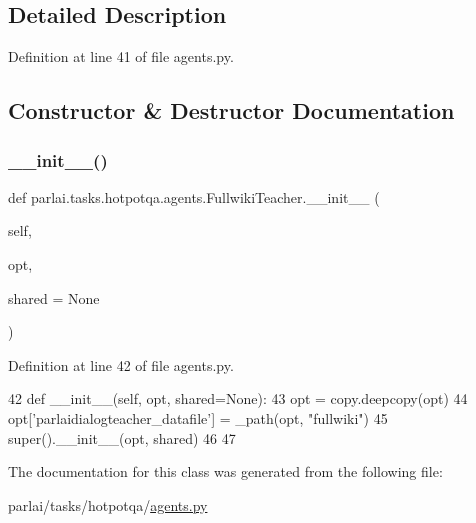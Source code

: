 \subsection{Detailed Description}


Definition at line 41 of file agents.\+py.



\subsection{Constructor \& Destructor Documentation}
\mbox{\label{classparlai_1_1tasks_1_1hotpotqa_1_1agents_1_1FullwikiTeacher_a7e12fc08024330f828800caee978f7d7}} 
\subsubsection{\texorpdfstring{\+\_\+\+\_\+init\+\_\+\+\_\+()}{\_\_init\_\_()}}
{\footnotesize\ttfamily def parlai.\+tasks.\+hotpotqa.\+agents.\+Fullwiki\+Teacher.\+\_\+\+\_\+init\+\_\+\+\_\+ (\begin{DoxyParamCaption}\item[{}]{self,  }\item[{}]{opt,  }\item[{}]{shared = {\ttfamily None} }\end{DoxyParamCaption})}



Definition at line 42 of file agents.\+py.


\begin{DoxyCode}
42     \textcolor{keyword}{def }\_\_init\_\_(self, opt, shared=None):
43         opt = copy.deepcopy(opt)
44         opt[\textcolor{stringliteral}{'parlaidialogteacher\_datafile'}] = \_path(opt, \textcolor{stringliteral}{"fullwiki"})
45         super().\_\_init\_\_(opt, shared)
46 
47 
\end{DoxyCode}


The documentation for this class was generated from the following file\+:\begin{DoxyCompactItemize}
\item 
parlai/tasks/hotpotqa/\hyperlink{parlai_2tasks_2hotpotqa_2agents_8py}{agents.\+py}\end{DoxyCompactItemize}
